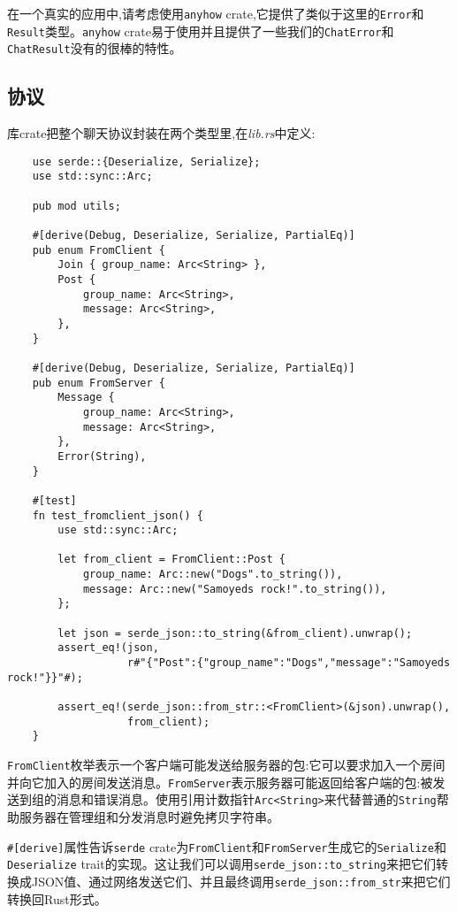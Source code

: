 在一个真实的应用中,请考虑使用\texttt{anyhow} crate,它提供了类似于这里的\texttt{Error}和\texttt{Result}类型。\texttt{anyhow} crate易于使用并且提供了一些我们的\texttt{ChatError}和\texttt{ChatResult}没有的很棒的特性。

\subsection{协议}
库crate把整个聊天协议封装在两个类型里,在\emph{lib.rs}中定义:
\begin{verbatim}
    use serde::{Deserialize, Serialize};
    use std::sync::Arc;

    pub mod utils;

    #[derive(Debug, Deserialize, Serialize, PartialEq)]
    pub enum FromClient {
        Join { group_name: Arc<String> },
        Post {
            group_name: Arc<String>,
            message: Arc<String>,
        },
    }

    #[derive(Debug, Deserialize, Serialize, PartialEq)]
    pub enum FromServer {
        Message {
            group_name: Arc<String>,
            message: Arc<String>,
        },
        Error(String),
    }

    #[test]
    fn test_fromclient_json() {
        use std::sync::Arc;

        let from_client = FromClient::Post {
            group_name: Arc::new("Dogs".to_string()),
            message: Arc::new("Samoyeds rock!".to_string()),
        };

        let json = serde_json::to_string(&from_client).unwrap();
        assert_eq!(json,
                   r#"{"Post":{"group_name":"Dogs","message":"Samoyeds rock!"}}"#);
        
        assert_eq!(serde_json::from_str::<FromClient>(&json).unwrap(),
                   from_client);
    }
\end{verbatim}

\texttt{FromClient}枚举表示一个客户端可能发送给服务器的包:它可以要求加入一个房间并向它加入的房间发送消息。\texttt{FromServer}表示服务器可能返回给客户端的包:被发送到组的消息和错误消息。使用引用计数指针\texttt{Arc<String>}来代替普通的\texttt{String}帮助服务器在管理组和分发消息时避免拷贝字符串。

\texttt{\#[derive]}属性告诉\texttt{serde} crate为\texttt{FromClient}和\texttt{FromServer}生成它的\texttt{Serialize}和\texttt{Deserialize} trait的实现。这让我们可以调用\texttt{serde\_json::to\_string}来把它们转换成JSON值、通过网络发送它们、并且最终调用\texttt{serde\_json::from\_str}来把它们转换回Rust形式。

